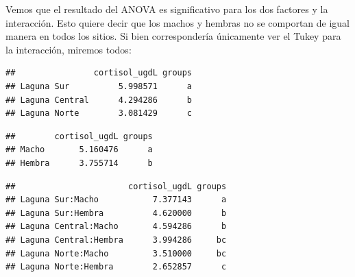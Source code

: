 \documentclass[
]{article}
\newenvironment{Shaded}{\begin{snugshade}}{\end{snugshade}}
\newcommand{\FunctionTok}[1]{\textcolor[rgb]{0.13,0.29,0.53}{\textbf{#1}}}
\newcommand{\NormalTok}[1]{#1}
\newcommand{\OtherTok}[1]{\textcolor[rgb]{0.56,0.35,0.01}{#1}}
\newcommand{\SpecialCharTok}[1]{\textcolor[rgb]{0.81,0.36,0.00}{\textbf{#1}}}
\newcommand{\StringTok}[1]{\textcolor[rgb]{0.31,0.60,0.02}{#1}}
\begin{document}
Vemos que el resultado del ANOVA es significativo para los dos factores
y la interacción. Esto quiere decir que los machos y hembras no se
comportan de igual manera en todos los sitios. Si bien correspondería
únicamente ver el Tukey para la interacción, miremos todos:

\begin{Shaded}
\end{Shaded}

\begin{verbatim}
##                cortisol_ugdL groups
## Laguna Sur          5.998571      a
## Laguna Central      4.294286      b
## Laguna Norte        3.081429      c
\end{verbatim}

\begin{Shaded}
\end{Shaded}

\begin{verbatim}
##        cortisol_ugdL groups
## Macho       5.160476      a
## Hembra      3.755714      b
\end{verbatim}

\begin{Shaded}
\end{Shaded}

\begin{verbatim}
##                       cortisol_ugdL groups
## Laguna Sur:Macho           7.377143      a
## Laguna Sur:Hembra          4.620000      b
## Laguna Central:Macho       4.594286      b
## Laguna Central:Hembra      3.994286     bc
## Laguna Norte:Macho         3.510000     bc
## Laguna Norte:Hembra        2.652857      c
\end{verbatim}
\end{document}
